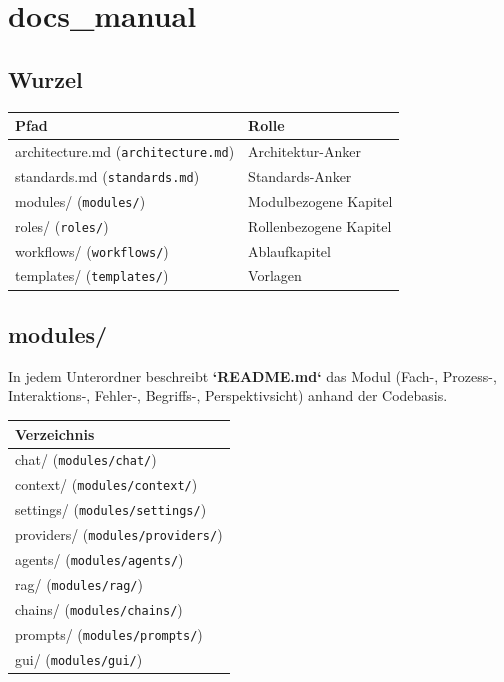 \section{docs\_manual}

\subsection{Wurzel}

\begin{center}
\begin{tabular}{ll}
\hline
Pfad & Rolle \\
\hline
architecture.md (\texttt{architecture.md}) & Architektur-Anker \\
standards.md (\texttt{standards.md}) & Standards-Anker \\
modules/ (\texttt{modules/}) & Modulbezogene Kapitel \\
roles/ (\texttt{roles/}) & Rollenbezogene Kapitel \\
workflows/ (\texttt{workflows/}) & Ablaufkapitel \\
templates/ (\texttt{templates/}) & Vorlagen \\
\hline
\end{tabular}
\end{center}

\subsection{modules/}

In jedem Unterordner beschreibt \textbf{`README.md`} das Modul (Fach-, Prozess-, Interaktions-, Fehler-, Begriffs-, Perspektivsicht) anhand der Codebasis.

\begin{center}
\begin{tabular}{l}
\hline
Verzeichnis \\
\hline
chat/ (\texttt{modules/chat/}) \\
context/ (\texttt{modules/context/}) \\
settings/ (\texttt{modules/settings/}) \\
providers/ (\texttt{modules/providers/}) \\
agents/ (\texttt{modules/agents/}) \\
rag/ (\texttt{modules/rag/}) \\
chains/ (\texttt{modules/chains/}) \\
prompts/ (\texttt{modules/prompts/}) \\
gui/ (\texttt{modules/gui/}) \\
\hline
\end{tabular}
\end{center}


